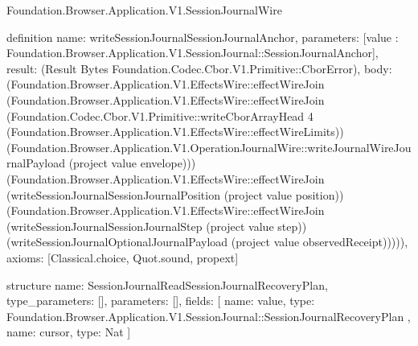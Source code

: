 \begin{lexlean}{Foundation.Browser.Application.V1.SessionJournalWire}
\begin{semanticmodule}
definition{
  name: writeSessionJournalSessionJournalAnchor,
  parameters: [value : Foundation.Browser.Application.V1.SessionJournal::SessionJournalAnchor],
  result: (Result Bytes Foundation.Codec.Cbor.V1.Primitive::CborError),
  body: (Foundation.Browser.Application.V1.EffectsWire::effectWireJoin (Foundation.Browser.Application.V1.EffectsWire::effectWireJoin (Foundation.Codec.Cbor.V1.Primitive::writeCborArrayHead 4 (Foundation.Browser.Application.V1.EffectsWire::effectWireLimits)) (Foundation.Browser.Application.V1.OperationJournalWire::writeJournalWireJournalPayload (project value envelope))) (Foundation.Browser.Application.V1.EffectsWire::effectWireJoin (writeSessionJournalSessionJournalPosition (project value position)) (Foundation.Browser.Application.V1.EffectsWire::effectWireJoin (writeSessionJournalSessionJournalStep (project value step)) (writeSessionJournalOptionalJournalPayload (project value observedReceipt))))),
  axioms: [Classical.choice, Quot.sound, propext]
}

structure{
  name: SessionJournalReadSessionJournalRecoveryPlan,
  type_parameters: [],
  parameters: [],
  fields: [
    {
      name: value,
      type: Foundation.Browser.Application.V1.SessionJournal::SessionJournalRecoveryPlan
    },
    {name: cursor, type: Nat}
  ]
}


\end{semanticmodule}
\end{lexlean}
